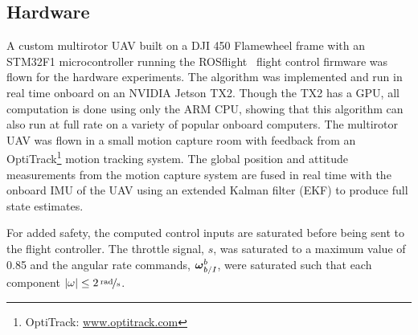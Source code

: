 
\subsection{Hardware}

A custom multirotor UAV built on a DJI 450 Flamewheel
frame with an STM32F1 microcontroller running the
ROSflight~\cite{jackson2016rosflight} flight control firmware was flown for the
hardware experiments. The algorithm was
implemented and run in real time onboard on an NVIDIA Jetson
TX2. Though the TX2 has a GPU, all computation is done using only the
ARM CPU, showing that this algorithm can also run at full rate on a variety
of popular onboard computers. The multirotor UAV was flown in a small motion capture room
with feedback from an OptiTrack\footnote{OptiTrack:
\href{www.optitrack.com}{www.optitrack.com}} motion tracking system. The global position and attitude
measurements from the motion capture system are fused in real time with the
onboard IMU of the UAV using an extended Kalman filter (EKF) to produce
full state estimates. 

For added safety, the computed control inputs are saturated before being sent to
the flight controller. The throttle signal, $s$, was saturated to a maximum
value of 0.85 and the angular rate commands, $\boldsymbol{\mathrm{\omega}}_{b/I}^b$, were
saturated such that each component $\left\vert \omega\right\vert \leq 2\,
\nicefrac{\mathrm{rad}}{\mathrm{s}}$.
